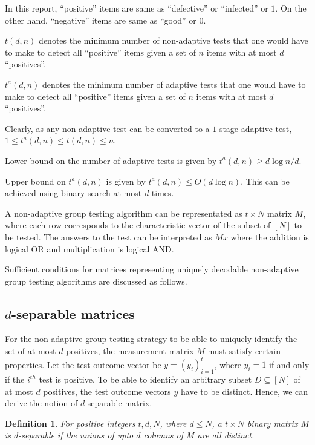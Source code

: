 \documentclass{article}
\newtheorem{definition}{Definition}
\begin{document}
In this report, ``positive'' items are same as ``defective'' or ``infected'' or $1$. On the
other hand, ``negative'' items are same as ``good'' or $0$.

$t(d, n)$ denotes the minimum number of non-adaptive tests that one would have to make to detect all
``positive'' items given a set of $n$ items with at most $d$ ``positives''.

$t^a(d, n)$ denotes the minimum number of adaptive tests that one would have to make to detect all
``positive'' items given a set of $n$ items with at most $d$ ``positives''.

Clearly, as any non-adaptive test can be converted to a $1$-stage adaptive test,
$1 \le t^a(d,n) \le t(d,n) \le n$.

Lower bound on the number of adaptive tests is given by $t^a(d,n) \ge d\log{n/d}$.

Upper bound on $t^a(d,n)$ is given by $t^a(d,n) \le O(d\log{n})$. This can be achieved
using binary search at most $d$ times.

A non-adaptive group testing algorithm can be representated as $t \times N$ matrix $M$,
where each row corresponds to the characteristic vector of the subset of $[N]$ to be tested.
The answers to the test can be interpreted as $Mx$ where the addition is logical OR and
multiplication is logical AND.

Sufficient conditions for matrices representing uniquely decodable
non-adaptive group testing algorithms are discussed as follows.

\subsection{$d$-separable matrices}

For the non-adaptive group testing strategy to be able to uniquely identify
the set of at most $d$ positives, the measurement matrix $M$ must satisfy certain
properties. Let the test outcome vector be $y = (y_i)_{i=1}^t$, where $y_i = 1$
if and only if the $i^{th}$ test is positive. To be able to identify an arbitrary
subset $D \subseteq [N]$ of at most $d$ positives, the test outcome vectors $y$
have to be distinct. Hence, we can derive the notion of $d$-separable matrix.

\begin{definition}
  For positive integers $t,d,N$, where $d \le N$, a $t \times N$ binary matrix $M$
  is $d$-separable\cite{rudra709} if the unions of upto $d$ columns of $M$ are all
  distinct.
\end{definition}
\end{document}
